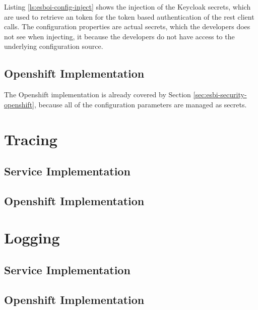 Listing \vref{ls:esboi-config-inject} shows the injection of the Keycloak secrets, which are used to retrieve an token for the token based authentication of the rest client calls. The configuration properties are actual secrets, which the developers does not see when injecting, it because the developers do not have access to the underlying configuration source.

\subsection{Openshift Implementation}
\label{sec:esbi-config-openshift}
The Openshift implementation is already covered by Section \vref{sec:esbi-security-openshift}, because all of the configuration parameters are managed as secrets. 










\section{Tracing}
\label{sec:esbi-tracing}

\subsection{Service Implementation}
\label{sec:esbi-tracing-service}

\subsection{Openshift Implementation}
\label{sec:esbi-tracing-openshift}

\section{Logging}
\label{sec:esbi-logging}

\subsection{Service Implementation}
\label{sec:esbi-logging-service}

\subsection{Openshift Implementation}
\label{sec:esbi-logging-openshift}

